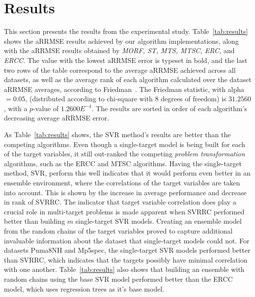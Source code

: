 \documentclass[preprint,12pt]{elsarticle}
\begin{document}
\section{Results}\label{sec:results}
This section presents the results from the experimental study. Table~\ref{tab:results} shows the aRRMSE results achieved by our algorithm implementations, along with the aRRMSE results obtained by \textit{MORF, ST, MTS, MTSC, ERC,} and \textit{ERCC}. The value with the lowest aRRMSE error is typeset in bold, and the last two rows of the table correspond to the average aRRMSE achieved across all datasets, as well as the average rank of each algorithm calculated over the dataset aRRMSE averages, according to Friedman~\cite{Garcia20102044}. The Friedman statistic, with alpha $= 0.05$, (distributed according to chi-square with $8$ degrees of freedom) is $31.2560$, with a $p$-value of $1.2600E^{-4}$. The results are sorted in order of each algorithm's decreasing average aRRMSE error.

As Table~\ref{tab:results} shows, the SVR method's results are better than the competing algorithms. Even though a single-target model is being built for each of the target variables, it still out-ranked the competing \textit{problem transformation} algorithms, such as the ERCC and MTSC algorithms. Having the single-target method, SVR, perform this well indicates that it would perform even better in an ensemble environment, where the correlations of the target variables are taken into account. This is shown by the increase in average performance and decrease in rank of SVRRC. The indicator that target variable correlation does play a crucial role in multi-target problems is made apparent when SVRRC performed better than building $m$ single-target SVR models. Creating an ensemble model from the random chains of the target variables proved to capture additional invaluable information about the dataset that single-target models could not. For datasets Puma8NH and Mp5spec, the single-target SVR models performed better than SVRRC, which indicates that the targets possibly have minimal correlation with one another. Table~\ref{tab:results} also shows that building an ensemble with random chains using the base SVR model performed better than the ERCC model, which uses regression trees as it's base model. 
\end{document}
